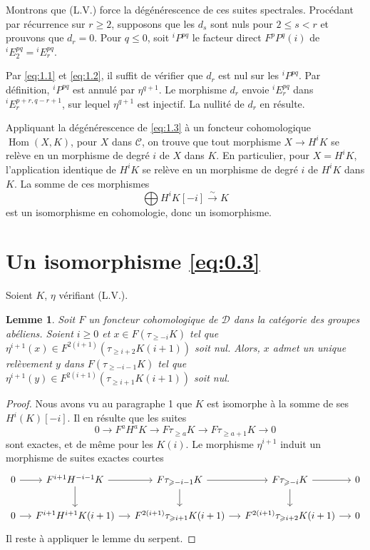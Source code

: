 \documentclass[11pt,a4paper]{article}
\theoremstyle{plain}
\newtheorem{lemma}[theorem]{Lemme}
\theoremstyle{definition}
\DeclareMathOperator{\Hom}{Hom}
\newcommand{\cD}{\mathscr{D}}
\newcommand{\cC}{\mathscr{C}}
\begin{document}
Montrons que (L.V.) force la d\'eg\'en\'erescence de ces suites spectrales. Proc\'edant par r\'ecurrence sur $r \geqslant 2$, supposons que les $d_s$ sont nuls pour $2 \leqslant s < r$ et prouvons que $d_r = 0$. Pour $q \leqslant 0$, soit ${}^i\!P^{pq}$ le facteur direct $F^p P^q(i)$ de ${}^i\!E_2^{pq} = {}^i\!E_r^{pq}$.

Par \eqref{eq:1.1} et \eqref{eq:1.2}, il suffit de v\'erifier que $d_r$ est nul sur les ${}^i\!P^{pq}$. Par d\'efinition, ${}^i\!P^{pq}$ est annul\'e par $\eta^{q+1}$. Le morphisme $d_r$ envoie ${}^i\!E_r^{pq}$ dans ${}^i\!E_r^{p+r,q-r+1}$, sur lequel $\eta^{q+1}$ est injectif. La nullit\'e de $d_r$ en r\'esulte.

Appliquant la d\'eg\'en\'erescence de \eqref{eq:1.3} \`a un foncteur cohomologique $\Hom(X,K)$, pour $X$ dans $\cC$, on trouve que tout morphisme $X \to H^i K$ se rel\`eve en un morphisme de degr\'e $i$ de $X$ dans $K$. En particulier, pour $X = H^i K$, l'application identique de $H^i K$ se rel\`eve en un morphisme de degr\'e $i$ de $H^i K$ dans $K$. La somme de ces morphismes
\[
\bigoplus H^i K[-i] \xrightarrow{\sim} K
\]
est un isomorphisme en cohomologie, donc un isomorphisme.

\section{Un isomorphisme \eqref{eq:0.3}}

Soient $K$, $\eta$ v\'erifiant (L.V.).

\begin{lemma}\label{lem:2.1}
Soit $F$ un foncteur cohomologique de $\cD$ dans la cat\'egorie des groupes ab\'eliens. Soient $i \geqslant 0$ et $x \in F(\tau_{\geqslant -i} K)$ tel que $\eta^{i+1}(x) \in F^{2(i+1)}(\tau_{\geqslant i+2} K(i+1))$ soit nul. Alors, $x$ admet un unique rel\`evement $y$ dans $F(\tau_{\geqslant -i-1} K)$ tel que $\eta^{i+1}(y) \in F^{2(i+1)}(\tau_{\geqslant i+1} K(i+1))$ soit nul.
\end{lemma}

\begin{proof}
Nous avons vu au paragraphe 1 que $K$ est isomorphe \`a la somme de ses $H^i(K)[-i]$. Il en r\'esulte que les suites
\[
0 \to F^a H^a K \to F \tau_{\geqslant a} K \to F \tau_{\geqslant a+1} K \to 0
\]
sont exactes, et de m\^eme pour les $K(i)$. Le morphisme $\eta^{i+1}$ induit un morphisme de suites exactes courtes
\[
\begin{tikzcd}[column sep=small]
0 \arrow[r] & F^{i+1} H^{-i-1} K \arrow[r] \arrow[d] & F \tau_{\geqslant -i-1} K \arrow[r] \arrow[d] & F \tau_{\geqslant -i} K \arrow[r] \arrow[d] & 0 \\
0 \arrow[r] & F^{i+1} H^{i+1} K(i+1) \arrow[r] & F^{2(i+1)} \tau_{\geqslant i+1} K(i+1) \arrow[r] & F^{2(i+1)} \tau_{\geqslant i+2} K(i+1) \arrow[r] & 0
\end{tikzcd}
\]
Il reste \`a appliquer le lemme du serpent.
\end{proof}
\end{document}
